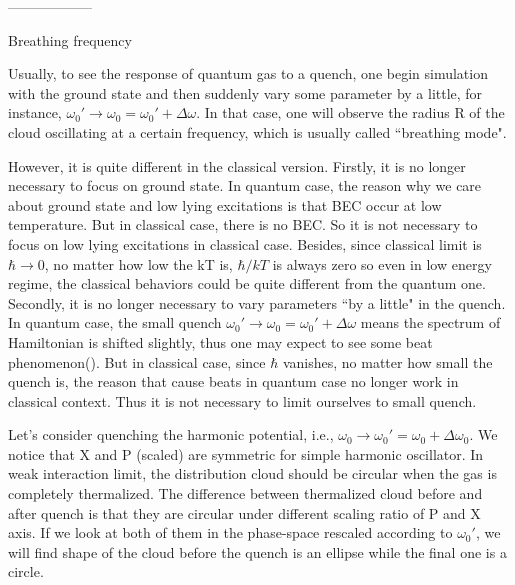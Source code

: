 \documentclass[aps,preprintnumbers,onecolumn,amsmath,amssymb,floatfix,pra]{revtex4-1}
\begin{document}


------------------

Breathing frequency 

Usually, to see the response of quantum gas to a quench, one begin simulation with the ground state
and then suddenly vary some parameter by a little, for instance,
$\omega_0'\rightarrow\omega_0=\omega_0'+\Delta\omega$. In that case, one will observe the radius R
of the cloud oscillating at a certain frequency, which is usually called ``breathing mode".

However, it is quite different in the classical version. Firstly, it is no longer necessary to focus
on ground state. In quantum case, the reason why we care about ground state and low lying
excitations is that BEC occur at low temperature. But in classical case, there is no BEC. So it is
not necessary to focus on low lying excitations in classical case. Besides, since classical limit is
$\hbar\rightarrow 0$, no matter how low the kT is, $\hbar/kT$ is always zero so even in low energy
regime, the classical behaviors could be quite different from the quantum one. Secondly, it is no
longer necessary to vary parameters ``by a little" in the quench. In quantum case, the small quench
$\omega_0'\rightarrow\omega_0=\omega_0'+\Delta\omega$ means the spectrum of Hamiltonian is shifted
slightly, thus one may expect to see some beat phenomenon({\color{red}{?}}). But in classical case,
since $\hbar$ vanishes, no matter how small the quench is, the reason that cause beats in quantum
case no longer work in classical context. Thus it is not necessary to limit ourselves to small
quench.

Let's consider quenching the harmonic potential, i.e.,
$\omega_0\rightarrow\omega_0'=\omega_0+\Delta\omega_0$. We notice that X and P (scaled) are
symmetric for simple harmonic oscillator. In weak interaction limit, the distribution cloud should
be circular when the gas is completely thermalized. The difference between thermalized cloud before
and after quench is that they are circular under different scaling ratio of P and X axis. If we look
at both of them in the phase-space rescaled according to $\omega_0'$, we will find shape of the
cloud before the quench is an ellipse while the final one is a circle.
\end{document}
